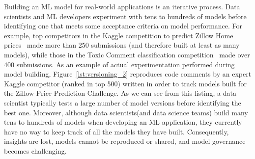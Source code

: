 \documentclass[11pt]{article}
\newcommand{\Dss}{Data scientists\xspace}
\newcommand{\dss}{data scientists\xspace}
\newcommand{\ds}{data scientist\xspace}
\newcommand{\mldevs}{ML developers\xspace}
\begin{document}
Building an ML model for real-world applications is an iterative process. 
\Dss and \mldevs experiment with tens to hundreds of models before identifying 
one that meets some acceptance criteria on model performance.
For example, top competitors in the Kaggle competition to predict Zillow Home prices~\cite{zillow} made more than 250 submissions (and therefore built at least as many models), while those in the Toxic Comment classification competition~\cite{toxic-comments} made over 400 submissions.
As an example of actual experimentation performed during model building, Figure~\ref{lst:versioning_2} reproduces code comments by an expert Kaggle competitor (ranked in top 500) written in order to track models built for the Zillow Price Prediction Challenge.
As we can see from this listing, a \ds typically tests a large number of model versions before identifying the best one.
Moreover, although \dss (and data science teams) build many tens to hundreds of models
when developing an ML application, they currently have no way to keep track of all 
the models they have built.
Consequently, insights are lost, models cannot be reproduced or shared, and model governance becomes challenging.






\end{document}
